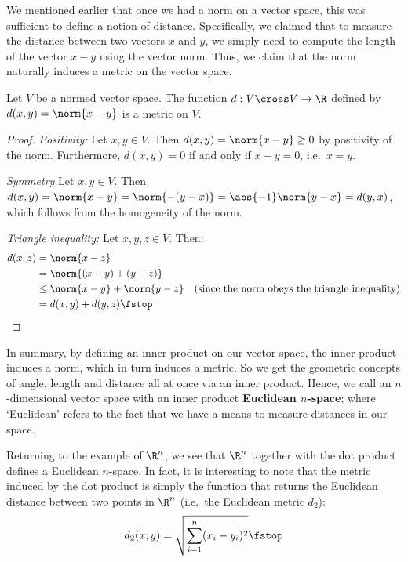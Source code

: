 We mentioned earlier that once we had a norm on a vector space, this was sufficient to define a notion of distance. Specifically, we claimed that to measure the distance between two vectors \( x \) and \( y \), we simply need to compute the length of the vector \( x-y \) using the vector norm. Thus, we claim that the norm naturally induces a metric on the vector space.

\begin{theorem}
  Let \( V \) be a normed vector space. The function \( d:V\cross V\to\R \) defined by \( d(x,y)=\norm{x-y} \) is a metric on \( V \).
\end{theorem}
\begin{proof}
  \emph{Positivity:} Let \( x,y\in V \). Then \( d(x,y)=\norm{x-y}\geq 0 \) by positivity of the norm. Furthermore, \( d(x,y)=0 \) if and only if \( x-y=0 \), i.e.\ \( x=y \).

  \vspace{3mm}

  \emph{Symmetry} Let \( x,y\in V \). Then \( d(x,y)=\norm{x-y}=\norm{-(y-x)}=\abs{-1}\norm{y-x}=d(y,x) \), which follows from the homogeneity of the norm.

  \vspace{3mm}

  \emph{Triangle inequality:} Let \( x,y,z\in V \). Then:
  \begin{align*}
    d(x,z)&= \norm{x-z}\\
    &= \norm{(x-y)+(y-z)}\\
    &\leq \norm{x-y}+\norm{y-z} &(\text{since the norm obeys the triangle inequality})\\
    &= d(x,y)+d(y,z)\fstop
  \end{align*}
\end{proof}

In summary, by defining an inner product on our vector space, the inner product induces a norm, which in turn induces a metric. So we get the geometric concepts of angle, length and distance all at once via an inner product. Hence, we call an \( n \)-dimensional vector space with an inner product \textbf{Euclidean \( n \)-space}; where `Euclidean' refers to the fact that we have a means to measure distances in our space.

\vspace{3mm}

Returning to the example of \( \R^n \), we see that \( \R^n \) together with the dot product defines a Euclidean \( n \)-space. In fact, it is interesting to note that the metric induced by the dot product is simply the function that returns the Euclidean distance between two points in \( \R^n \) (i.e.\ the Euclidean metric \( d_2 \)):
\[ d_2(x,y)=\sqrt{\sum_{i=1}^n(x_i-y_i)^2}\fstop \]

